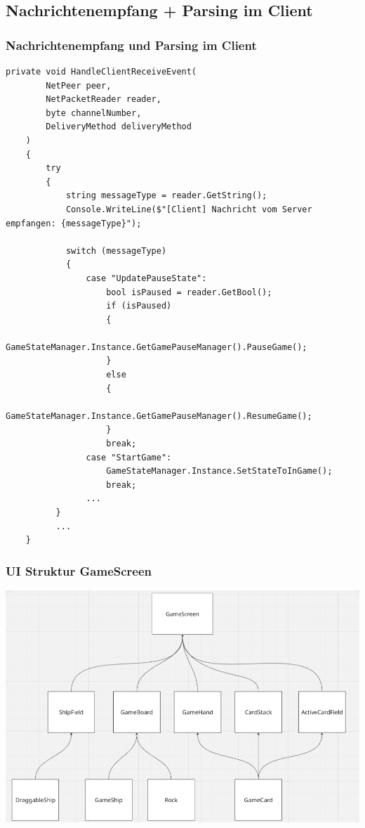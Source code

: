 \documentclass{beamer}
\begin{document}
\subsection{Nachrichtenempfang + Parsing im Client}
\begin{frame}[fragile]
\frametitle{Nachrichtenempfang und Parsing im Client}
  \begin{lstlisting}[language=CSharp, basicstyle=\ttfamily\tiny, breaklines=true]
     private void HandleClientReceiveEvent(
        NetPeer peer,
        NetPacketReader reader,
        byte channelNumber,
        DeliveryMethod deliveryMethod
    )
    {
        try
        {
            string messageType = reader.GetString();
            Console.WriteLine($"[Client] Nachricht vom Server empfangen: {messageType}");

            switch (messageType)
            {
                case "UpdatePauseState":
                    bool isPaused = reader.GetBool();
                    if (isPaused)
                    {
                        GameStateManager.Instance.GetGamePauseManager().PauseGame();
                    }
                    else
                    {
                        GameStateManager.Instance.GetGamePauseManager().ResumeGame();
                    }
                    break;
                case "StartGame":
                    GameStateManager.Instance.SetStateToInGame();
                    break;
                ...
          }
          ...
    }
  \end{lstlisting}
\end{frame}



\begin{frame}
  \frametitle{UI Struktur GameScreen}
  \includegraphics[width=\textwidth]{UI-Struktur.png}
\end{frame}
\end{document}
